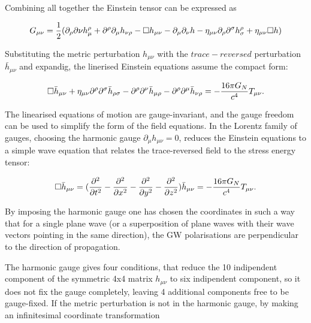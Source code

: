 \documentclass[binding=0.6cm, LaM]{sapthesis}
\begin{document}
	Combining all together the Einstein tensor can be expressed as
	
		\begin{equation}
		G_{\mu\nu} = {1 \over 2}(\partial_{\rho}\partial{\nu}h^{\rho}_{\mu} + \partial^{\rho}\partial_{\mu}h_{\nu\rho} - \square h_{\mu\nu} - \partial_{\mu}\partial_{\nu}h - \eta_{\mu\nu}\partial_{\rho}\partial^{\sigma}h^{\rho}_{\sigma} + \eta_{\mu\nu}\square h)
		\end{equation}

	Substituting the metric perturbation $h_{\mu\nu}$  with the $trace-reversed$ perturbation ${\bar h}_{\mu\nu}$ and expandig, 
	the linerised Einstein equations assume the  compact form:

		\begin{equation}
		\square {\bar h}_{\mu\nu} + \eta_{\mu\nu}{\partial}^{\rho}{\partial}^{\sigma}{\bar h}_{\rho\sigma} - {\partial}^{\rho}{\partial}^{\nu}{\bar h}_{\mu\rho} - {\partial}^{\rho}{\partial}^{\mu}{\bar h}_{\nu\rho} = - {{16\pi G_{N}} \over {c^4}}T_{\mu\nu}.
		\end{equation}

	The linearised equations of motion are gauge-invariant, and the gauge freedom can
 	be used to simplify the form of the field equations.
 	In the Lorentz family of gauges, choosing the harmonic gauge $ \partial_{\mu}h_{\mu\nu} = 0 $, 
	reduces the Einstein equations to a simple wave equation that relates the trace-reversed field
 	to the stress energy tensor:

		\begin{equation}
		\square {\bar h}_{\mu\nu} =({\partial^2 \over {\partial t^2} } - {\partial^2 \over {\partial x^2}}  - {\partial^2 \over {\partial y^2}}  -  {\partial^2 \over {\partial z^2}}) {\bar h}_{\mu\nu} = -{{16\pi G_{N}} \over {c^4}}T_{\mu\nu}. 
		\end{equation}

	By imposing the harmonic gauge one has chosen the coordinates in such a way that for a single plane wave 
	(or a superposition of plane waves with their wave vectors pointing in the same direction),
	the GW polarisations are perpendicular to the direction of propagation.

	The harmonic gauge gives four conditions, that reduce the 10 indipendent component of the symmetric 4x4 matrix 
	$h_{\mu\nu}$ to six indipendent component, so it does not fix the gauge completely,
	leaving 4 additional components free to be gauge-fixed.
	If the metric perturbation is not in the harmonic gauge, by making an infinitesimal coordinate transformation
\end{document}
